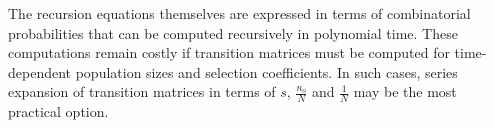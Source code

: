 \documentclass[review,nonatbib]{elsarticle}
\newcommand{\afs}[2]{\Phi_{#1}^{(#2)}}
\begin{document}

The recursion equations themselves  are expressed in terms of combinatorial probabilities that can
be computed recursively in polynomial time. These computations remain costly if transition matrices
must be computed for time-dependent population sizes and selection coefficients. In such cases,
series expansion of transition matrices in terms of $s$, $\frac{n_o}{N}$ and $\frac{1}{N}$ may be
the most practical option.






\end{document}

